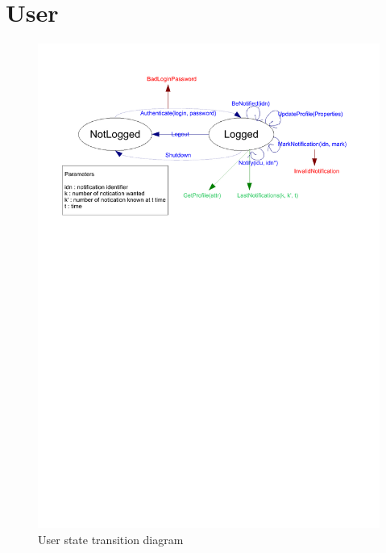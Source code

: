 \section{User}
	\begin{figure}[ht]
			\begin{center}
				\includegraphics[width=\textwidth,  trim=2cm 18cm 2cm 1cm]{UML_figure/state_transition/dojo_logic/st_user.pdf}
				\caption{User state transition diagram}
			\end{center}
	\end{figure}
\newpage

